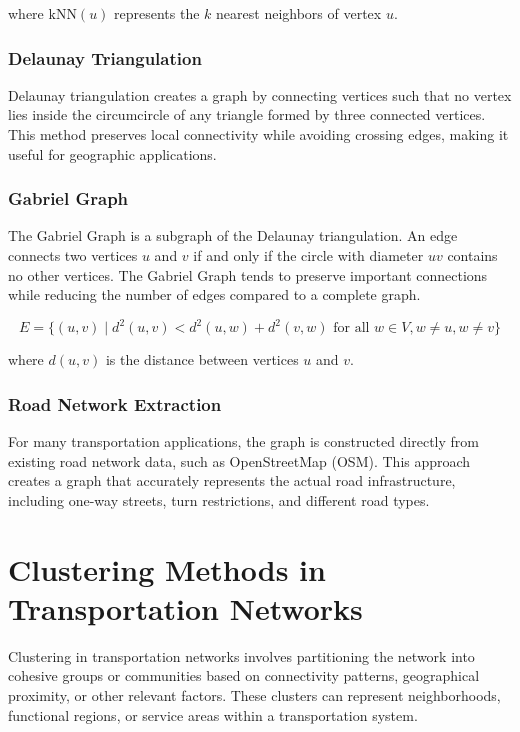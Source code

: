 where $\text{kNN}(u)$ represents the $k$ nearest neighbors of vertex $u$.

\subsubsection{Delaunay Triangulation}
Delaunay triangulation creates a graph by connecting vertices such that no vertex lies inside the circumcircle of any triangle formed by three connected vertices. This method preserves local connectivity while avoiding crossing edges, making it useful for geographic applications.

\subsubsection{Gabriel Graph}
The Gabriel Graph is a subgraph of the Delaunay triangulation. An edge connects two vertices $u$ and $v$ if and only if the circle with diameter $uv$ contains no other vertices. The Gabriel Graph tends to preserve important connections while reducing the number of edges compared to a complete graph.

\begin{equation}
    E = \{(u, v) \mid d^2(u, v) < d^2(u, w) + d^2(v, w) \text{ for all } w \in V, w \neq u, w \neq v\}
\end{equation}

where $d(u, v)$ is the distance between vertices $u$ and $v$.

\subsubsection{Road Network Extraction}
For many transportation applications, the graph is constructed directly from existing road network data, such as OpenStreetMap (OSM). This approach creates a graph that accurately represents the actual road infrastructure, including one-way streets, turn restrictions, and different road types.

\section{Clustering Methods in Transportation Networks}
\label{se:ClusteringMethods}

Clustering in transportation networks involves partitioning the network into cohesive groups or communities based on connectivity patterns, geographical proximity, or other relevant factors. These clusters can represent neighborhoods, functional regions, or service areas within a transportation system.

